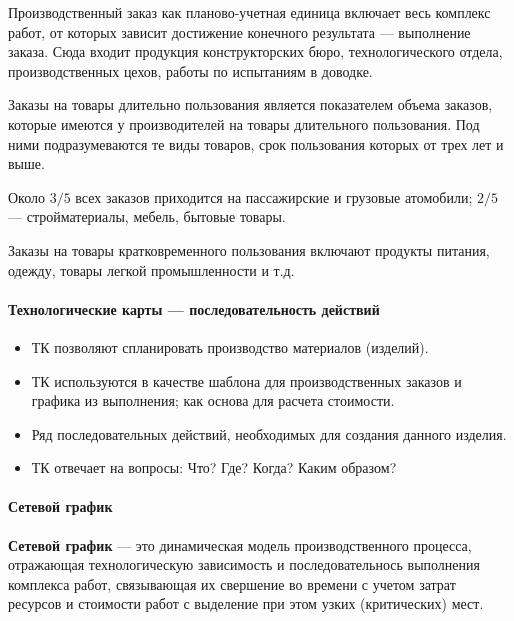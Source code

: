 Производственный заказ как планово-учетная единица включает весь комплекс работ,
от которых зависит достижение конечного результата --- выполнение заказа. Сюда
входит продукция конструкторских бюро, технологического отдела, производственных
цехов, работы по испытаниям в доводке.

Заказы на товары длительно пользования является показателем объема заказов,
которые имеются у производителей на товары длительного пользования. Под ними
подразумеваются те виды товаров, срок пользования которых от трех лет и выше.

Около $3 / 5$  всех заказов приходится на пассажирские и грузовые атомобили; $2
/ 5$  --- стройматериалы, мебель, бытовые товары.

Заказы на товары кратковременного пользования включают продукты питания, одежду,
товары легкой промышленности и т.д.

\paragraph{Технологические карты --- последовательность действий}
\begin{itemize}
  \item ТК позволяют спланировать производство материалов (изделий).
  \item ТК используются в качестве шаблона для производственных заказов и
    графика из выполнения; как основа для расчета стоимости.
  \item Ряд последовательных действий, необходимых для создания данного изделия.
  \item ТК отвечает на вопросы: Что? Где? Когда? Каким образом? 
\end{itemize}

\paragraph{Сетевой график}
\textbf{Сетевой график} --- это динамическая модель производственного процесса,
отражающая технологическую зависимость и последовательнось выполнения комплекса
работ, связывающая их свершение во времени с учетом затрат ресурсов и стоимости
работ с выделение при этом узких (критических) мест.
